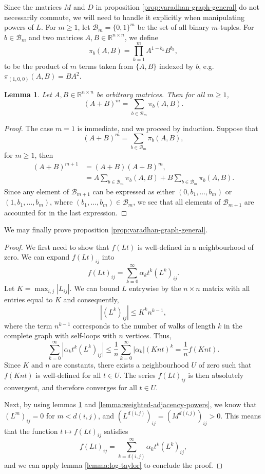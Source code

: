 \documentclass[11pt]{article}
\def\R{\mathbb{R}}
\newtheorem{lemma}{Lemma}[section]
\theoremstyle{definition}
\begin{document}
Since the matrices $M$ and $D$ in proposition \ref{prop:varadhan-graph-general} do not necessarily commute, we will need to handle it explicitly when manipulating powers of $L$. For $m\ge 1$, let $\mathcal{B}_m = \{0,1\}^m$ be the set of all binary $m$-tuples. For $b \in \mathcal{B}_m$ and two matrices $A,B \in \R^{n\times n}$, we define
$$ \pi_b (A,B) = \prod_{k=1}^m A^{1-b_k} B^{b_k}, $$
to be the product of $m$ terms taken from $\{A,B\}$ indexed by $b$, e.g. $\pi_{(1,0,0)}(A,B) = BA^2$.

\begin{lemma} \label{lemma:noncommutative-binomial-formula}
    Let $A,B \in \R^{n\times n}$ be arbitrary matrices. Then for all $m\ge 1$, 
    $$ (A+B)^m = \sum_{b\in \mathcal{B}_m} \pi_b (A,B). $$
\end{lemma}
\begin{proof}
    The case $m=1$ is immediate, and we proceed by induction. Suppose that
    $$ (A+B)^m = \sum_{b\in \mathcal{B}_m} \pi_b (A,B), $$
    for $m\ge 1$, then
    \begin{align*}
        (A+B)^{m+1} &= (A+B) (A+B)^m,\\
        &= A \sum_{b\in \mathcal{B}_m} \pi_b (A,B) + B \sum_{b\in \mathcal{B}_m} \pi_b (A,B).
    \end{align*}
    Since any element of $\mathcal{B}_{m+1}$ can be expressed as either $(0, b_1,\dots,b_m)$ or $(1,b_1,\dots,b_m)$, where $(b_1,\dots,b_m)\in \mathcal{B}_m$, we see that all elements of $\mathcal{B}_{m+1}$ are accounted for in the last expression.
\end{proof}

We may finally prove proposition \ref{prop:varadhan-graph-general}.

\begin{proof}
    We first need to show that $f(L t)$ is well-defined in a neighbourhood of zero. We can expand $f(Lt)_{ij}$ into
    $$ f(Lt)_{ij} = \sum_{k=0}^\infty \alpha_k t^k (L^k)_{ij}. $$
    Let $K = \max_{i,j} |L_{ij}|$. We can bound $L$ entrywise by the $n\times n$ matrix with all entries equal to $K$ and consequently,
    $$ |(L^k)_{ij}| \le K^k n^{k-1}, $$
    where the term $n^{k-1}$ corresponds to the number of walks of length $k$ in the complete graph with self-loops with $n$ vertices. Thus,
    $$ \sum_{k=0}^\infty |\alpha_k t^k (L^k)_{ij}| \le \frac{1}{n} \sum_{k=0}^\infty |\alpha_k| (Knt)^k = \frac{1}{n} f(Knt). $$
    Since $K$ and $n$ are constants, there exists a neighbourhood $U$ of zero such that $f(Knt)$ is well-defined for all $t\in U$. The series $f(Lt)_{ij}$ is then absolutely convergent, and therefore converges for all $t\in U$.

    Next, by using lemmas \ref{lemma:noncommutative-binomial-formula} and \ref{lemma:weighted-adjacency-powers}, we know that $(L^m)_{ij} = 0$ for $m<d(i,j)$, and $(L^{d(i,j)})_{ij} = (M^{d(i,j)})_{ij} > 0$. This means that the function $t \mapsto f(Lt)_{ij}$ satisfies 
    $$ f(Lt)_{ij} = \sum_{k=d(i,j)}^\infty \alpha_k t^k (L^k)_{ij}, $$
    and we can apply lemma \ref{lemma:log-taylor} to conclude the proof.
\end{proof}
\end{document}
